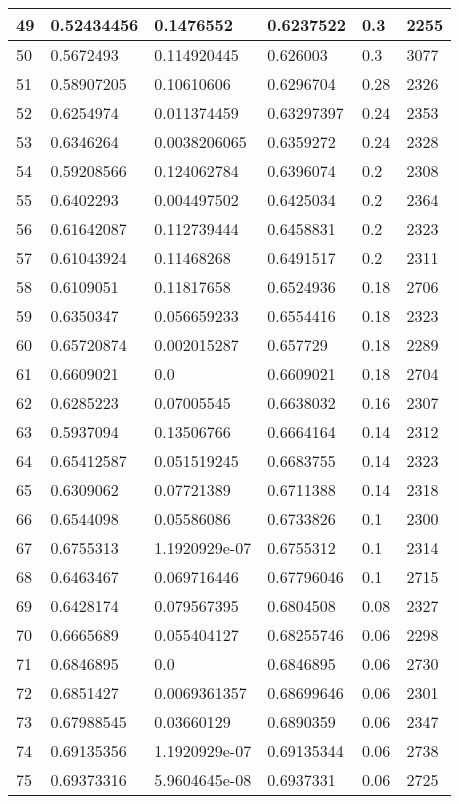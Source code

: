 \begin{longtable}{|l|l|l|l|l|l|}
49 & 0.52434456 & 0.1476552 & 0.6237522 & 0.3 & 2255 \\ \hline 
50 & 0.5672493 & 0.114920445 & 0.626003 & 0.3 & 3077 \\ \hline 
51 & 0.58907205 & 0.10610606 & 0.6296704 & 0.28 & 2326 \\ \hline 
52 & 0.6254974 & 0.011374459 & 0.63297397 & 0.24 & 2353 \\ \hline 
53 & 0.6346264 & 0.0038206065 & 0.6359272 & 0.24 & 2328 \\ \hline 
54 & 0.59208566 & 0.124062784 & 0.6396074 & 0.2 & 2308 \\ \hline 
55 & 0.6402293 & 0.004497502 & 0.6425034 & 0.2 & 2364 \\ \hline 
56 & 0.61642087 & 0.112739444 & 0.6458831 & 0.2 & 2323 \\ \hline 
57 & 0.61043924 & 0.11468268 & 0.6491517 & 0.2 & 2311 \\ \hline 
58 & 0.6109051 & 0.11817658 & 0.6524936 & 0.18 & 2706 \\ \hline 
59 & 0.6350347 & 0.056659233 & 0.6554416 & 0.18 & 2323 \\ \hline 
60 & 0.65720874 & 0.002015287 & 0.657729 & 0.18 & 2289 \\ \hline 
61 & 0.6609021 & 0.0 & 0.6609021 & 0.18 & 2704 \\ \hline 
62 & 0.6285223 & 0.07005545 & 0.6638032 & 0.16 & 2307 \\ \hline 
63 & 0.5937094 & 0.13506766 & 0.6664164 & 0.14 & 2312 \\ \hline 
64 & 0.65412587 & 0.051519245 & 0.6683755 & 0.14 & 2323 \\ \hline 
65 & 0.6309062 & 0.07721389 & 0.6711388 & 0.14 & 2318 \\ \hline 
66 & 0.6544098 & 0.05586086 & 0.6733826 & 0.1 & 2300 \\ \hline 
67 & 0.6755313 & 1.1920929e-07 & 0.6755312 & 0.1 & 2314 \\ \hline 
68 & 0.6463467 & 0.069716446 & 0.67796046 & 0.1 & 2715 \\ \hline 
69 & 0.6428174 & 0.079567395 & 0.6804508 & 0.08 & 2327 \\ \hline 
70 & 0.6665689 & 0.055404127 & 0.68255746 & 0.06 & 2298 \\ \hline 
71 & 0.6846895 & 0.0 & 0.6846895 & 0.06 & 2730 \\ \hline 
72 & 0.6851427 & 0.0069361357 & 0.68699646 & 0.06 & 2301 \\ \hline 
73 & 0.67988545 & 0.03660129 & 0.6890359 & 0.06 & 2347 \\ \hline 
74 & 0.69135356 & 1.1920929e-07 & 0.69135344 & 0.06 & 2738 \\ \hline 
75 & 0.69373316 & 5.9604645e-08 & 0.6937331 & 0.06 & 2725 \\ \hline 
\end{longtable}